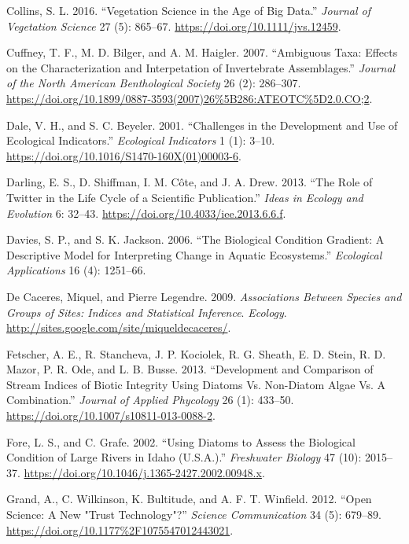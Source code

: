 \documentclass[fleqn,10pt,lineno]{wlpeerj} %
\begin{document}
\leavevmode\hypertarget{ref-Collins16}{}%
Collins, S. L. 2016. ``Vegetation Science in the Age of Big Data.'' \emph{Journal of Vegetation Science} 27 (5): 865--67. \url{https://doi.org/10.1111/jvs.12459}.

\leavevmode\hypertarget{ref-Cuffney07}{}%
Cuffney, T. F., M. D. Bilger, and A. M. Haigler. 2007. ``Ambiguous Taxa: Effects on the Characterization and Interpetation of Invertebrate Assemblages.'' \emph{Journal of the North American Benthological Society} 26 (2): 286--307. \url{https://doi.org/10.1899/0887-3593(2007)26\%5B286:ATEOTC\%5D2.0.CO;2}.

\leavevmode\hypertarget{ref-Dale01}{}%
Dale, V. H., and S. C. Beyeler. 2001. ``Challenges in the Development and Use of Ecological Indicators.'' \emph{Ecological Indicators} 1 (1): 3--10. \url{https://doi.org/10.1016/S1470-160X(01)00003-6}.

\leavevmode\hypertarget{ref-Darling13}{}%
Darling, E. S., D. Shiffman, I. M. Côte, and J. A. Drew. 2013. ``The Role of Twitter in the Life Cycle of a Scientific Publication.'' \emph{Ideas in Ecology and Evolution} 6: 32--43. \url{https://doi.org/10.4033/iee.2013.6.6.f}.

\leavevmode\hypertarget{ref-Davies06}{}%
Davies, S. P., and S. K. Jackson. 2006. ``The Biological Condition Gradient: A Descriptive Model for Interpreting Change in Aquatic Ecosystems.'' \emph{Ecological Applications} 16 (4): 1251--66.

\leavevmode\hypertarget{ref-DeCaceres09}{}%
De Caceres, Miquel, and Pierre Legendre. 2009. \emph{Associations Between Species and Groups of Sites: Indices and Statistical Inference}. \emph{Ecology}. \url{http://sites.google.com/site/miqueldecaceres/}.

\leavevmode\hypertarget{ref-Fetscher13}{}%
Fetscher, A. E., R. Stancheva, J. P. Kociolek, R. G. Sheath, E. D. Stein, R. D. Mazor, P. R. Ode, and L. B. Busse. 2013. ``Development and Comparison of Stream Indices of Biotic Integrity Using Diatoms Vs. Non-Diatom Algae Vs. A Combination.'' \emph{Journal of Applied Phycology} 26 (1): 433--50. \url{https://doi.org/10.1007/s10811-013-0088-2}.

\leavevmode\hypertarget{ref-Fore02}{}%
Fore, L. S., and C. Grafe. 2002. ``Using Diatoms to Assess the Biological Condition of Large Rivers in Idaho (U.S.A.).'' \emph{Freshwater Biology} 47 (10): 2015--37. \url{https://doi.org/10.1046/j.1365-2427.2002.00948.x}.

\leavevmode\hypertarget{ref-Grand12}{}%
Grand, A., C. Wilkinson, K. Bultitude, and A. F. T. Winfield. 2012. ``Open Science: A New "Trust Technology"?'' \emph{Science Communication} 34 (5): 679--89. \url{https://doi.org/10.1177\%2F1075547012443021}.
\end{document}
